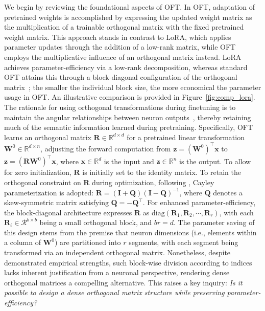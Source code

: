 We begin by reviewing the foundational aspects of OFT. In OFT, adaptation of pretrained weights is accomplished by expressing the updated weight matrix as the multiplication of a trainable orthogonal matrix with the fixed pretrained weight matrix. This approach stands in contrast to LoRA, which applies parameter updates through the addition of a low-rank matrix, while OFT employs the multiplicative influence of an orthogonal matrix instead. LoRA achieves parameter-efficiency via a low-rank decomposition, whereas standard OFT attains this through a block-diagonal configuration of the orthogonal matrix~\cite{qiu2023controlling}; the smaller the individual block size, the more economical the parameter usage in OFT. An illustrative comparison is provided in Figure~\ref{fig:comp_lora}. The rationale for using orthogonal transformations during finetuning is to maintain the angular relationships between neuron outputs~\cite{liu2018learning,liu2021orthogonal,qiu2023controlling}, thereby retaining much of the semantic information learned during pretraining. Specifically, OFT learns an orthogonal matrix $\bm{R}\in\mathbb{R}^{d\times d}$ for a pretrained linear transformation $\bm{W}^0\in\mathbb{R}^{d\times n}$, adjusting the forward computation from $\bm{z}=(\bm{W}^0)^\top\bm{x}$ to $\bm{z}=(\bm{R}\bm{W}^0)^\top\bm{x}$, where $\bm{x}\in\mathbb{R}^{d}$ is the input and $\bm{z}\in\mathbb{R}^{n}$ is the output. To allow for zero initialization, $\bm{R}$ is initially set to the identity matrix. To retain the orthogonal constraint on $\bm{R}$ during optimization, following \cite{qiu2023controlling,liu2021orthogonal}, Cayley parameterization is adopted: $\bm{R}=(\bm{I}+\bm{Q})(\bm{I}-\bm{Q})^{-1}$, where $\bm{Q}$ denotes a skew-symmetric matrix satisfying $\bm{Q}=-\bm{Q}^\top$. For enhanced parameter-efficiency, the block-diagonal architecture expresses $\bm{R}$ as $\text{diag}(\bm{R}_1,\bm{R}_2,\cdots,\bm{R}_r)$, with each $\bm{R}_i\in\mathcal{R}^{b\times b}$ being a small orthogonal block, and $br=d$. The parameter saving of this design stems from the premise that neuron dimensions (i.e., elements within a column of $\bm{W}^0$) are partitioned into $r$ segments, with each segment being transformed via an independent orthogonal matrix. Nonetheless, despite demonstrated empirical strengths, such block-wise division according to indices lacks inherent justification from a neuronal perspective, rendering dense orthogonal matrices a compelling alternative. This raises a key inquiry: \emph{Is it possible to design a dense orthogonal matrix structure while preserving parameter-efficiency?}

